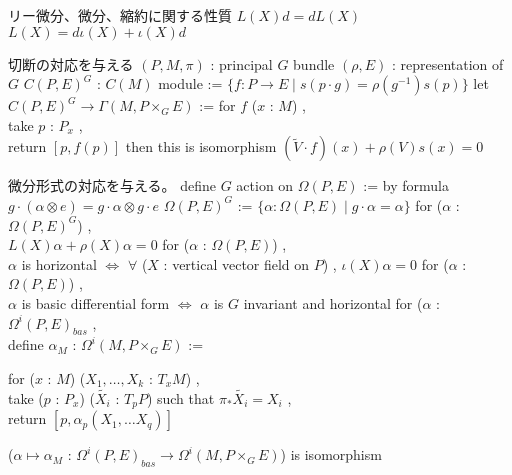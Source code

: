 \begin{Theorem}
\itemnote
  リー微分、微分、縮約に関する性質
\itemprop
  \(L(X)d = dL(X)\)
\itemprop
  \(L(X) = d \iota(X) + \iota(X) d\)
\end{Theorem}

\begin{Definition}
\itemnote
  切断の対応を与える
\itemwhen \((P , M , \pi)\) : principal \(G\) bundle
\itemwhen \((\rho , E)\) : representation of \(G\)
\itemdefi
  \(C(P , E)^G\) : \(C(M)\) module := \(\{f : P \to E \mid s(p \cdot g) = \rho(g^{-1}) s(p)\}\)
\itemprop
  let \(C(P , E)^G \to \Gamma(M , P \times_G E)\) :=
  for \(f\) (\(x\) : \(M\)) ,\\
  take \(p\) : \(P_x\) ,\\
  return \([p , f(p)]\)
  then this is isomorphism
\itemprop
  \((\tilde{V} \cdot f)(x) + \rho(V)s(x) = 0\)
\end{Definition}

\begin{Definition}
\itemnote
  微分形式の対応を与える。
\itemdefi
  define \(G\) action on \(\Omega(P , E)\) := by formula \(g \cdot (\alpha \otimes e) = g \cdot \alpha \otimes g \cdot e\)
\itemdefi
  \(\Omega(P , E)^G\) := \(\{\alpha : \Omega(P , E) \mid g \cdot \alpha = \alpha\}\)
\itemdefi
  for (\(\alpha\) : \(\Omega(P , E)^G\)) ,\\
  \(L(X)\alpha + \rho(X)\alpha = 0\)
\itemdefi
  for (\(\alpha\) : \(\Omega(P , E)\)) ,\\
  \(\alpha\) is horizontal \(\iff\) \(\forall\) (\(X\) : vertical vector field on \(P\)) , \(\iota(X)\alpha = 0\)
\itemdefi
  for (\(\alpha\) : \(\Omega(P , E)\)) ,\\
  \(\alpha\) is basic differential form \(\iff\) \(\alpha\) is \(G\) invariant and horizontal
\itemdefi
  for (\(\alpha\) : \(\Omega^i(P , E)_{bas}\) ,\\
  define \(\alpha_M\) : \(\Omega^i(M , P \times_G E)\) :=
  \begin{indentblock}
    for (\(x\) : \(M\)) (\(X_1 , \ldots , X_k\) : \(T_x M\)) ,\\
    take (\(p\) : \(P_x\)) (\(\tilde{X_i}\) : \(T_p P\)) such that \(\pi_* \tilde{X_i} = X_i\) ,\\
    return \([p , \alpha_p(X_1 , \ldots X_q)]\)
  \end{indentblock}
\itemprop
  (\(\alpha \mapsto \alpha_M\) : \(\Omega^i(P , E)_{bas} \to \Omega^i(M , P \times_G E)\)) is isomorphism
\end{Definition}